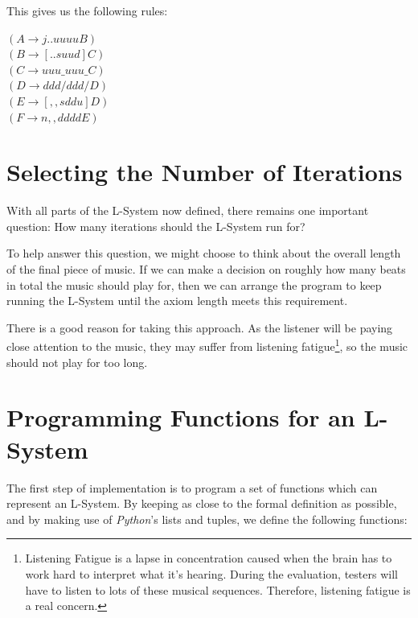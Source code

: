 This gives us the following rules:

\begin{singlespace}
\begin{formality}
$( A \rightarrow j..uuuuB )$\\
$( B \rightarrow [..suud]C )$\\
$( C \rightarrow uuu\_uuu\_C )$\\
$( D \rightarrow ddd/ddd/D )$\\
$( E \rightarrow [,,sddu]D )$\\
$( F \rightarrow n,,ddddE )$
\end{formality}
\end{singlespace}


\section{Selecting the Number of Iterations}

With all parts of the L-System now defined, there remains one important question: How many iterations should the L-System run for?

To help answer this question, we might choose to think about the overall length of the final piece of music. If we can make a decision on roughly how many beats in total the music should play for, then we can arrange the program to keep running the L-System until the axiom length meets this requirement.

There is a good reason for taking this approach. As the listener will be paying close attention to the music, they may suffer from listening fatigue\footnote{Listening Fatigue is a lapse in concentration caused when the brain has to work hard to interpret what it's hearing. During the evaluation, testers will have to listen to lots of these musical sequences. Therefore, listening fatigue is a real concern.}, so the music should not play for too long.


\section{Programming Functions for an L-System}
The first step of implementation is to program a set of functions which can represent an L-System. By keeping as close to the formal definition as possible, and by making use of \textit{Python}'s lists and tuples, we define the following functions:

